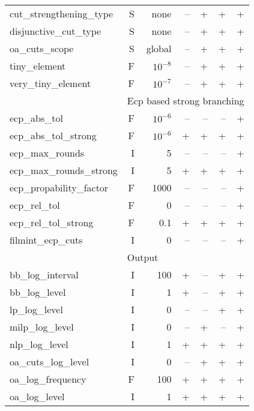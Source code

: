 \begin{center}
\begin{tabular}{|l|r|r|r|r|r|r|}
cut\_strengthening\_type& S& none& --& +& +& +\\
disjunctive\_cut\_type& S& none& --& +& +& +\\
oa\_cuts\_scope& S& global& --& +& +& +\\
tiny\_element& F& $10^{-8}$& --& +& +& +\\
very\_tiny\_element& F& $10^{-7}$& --& +& +& +\\
\hline
\multicolumn{1}{|c}{} & \multicolumn{6}{l|}{Ecp based strong branching}\\
\hline
ecp\_abs\_tol& F& $10^{-6}$& --& --& --& +\\
ecp\_abs\_tol\_strong& F& $10^{-6}$& +& +& +& +\\
ecp\_max\_rounds& I& 5& --& --& --& +\\
ecp\_max\_rounds\_strong& I& 5& +& +& +& +\\
ecp\_propability\_factor& F& 1000& --& --& --& +\\
ecp\_rel\_tol& F& 0& --& --& --& +\\
ecp\_rel\_tol\_strong& F& 0.1& +& +& +& +\\
filmint\_ecp\_cuts& I& 0& --& --& --& +\\
\hline
\multicolumn{1}{|c}{} & \multicolumn{6}{l|}{Output}\\
\hline
bb\_log\_interval& I& 100& +& --& +& +\\
bb\_log\_level& I& 1& +& --& +& +\\
lp\_log\_level& I& 0& --& --& +& +\\
milp\_log\_level& I& 0& --& +& --& +\\
nlp\_log\_level& I& 1& +& +& +& +\\
oa\_cuts\_log\_level& I& 0& --& +& +& +\\
oa\_log\_frequency& F& 100& +& +& +& +\\
oa\_log\_level& I& 1& +& +& +& +\\
\hline
\end{tabular}


\end{center}
